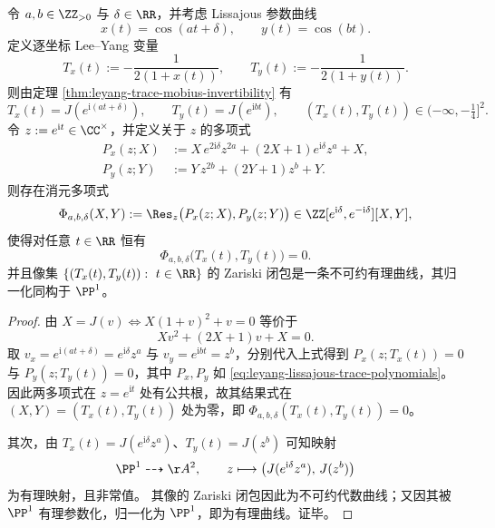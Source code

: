 \begin{theorem}[迹坐标门下的双奇异环消元与有理性]\label{thm:leyang-lissajous-trace-resultant-rational}
令 \(a,b\in\ZZ_{>0}\) 与 \(\delta\in\RR\)，并考虑 Lissajous 参数曲线
\[
x(t)=\cos(at+\delta),\qquad y(t)=\cos(bt).
\]
定义逐坐标 Lee--Yang 变量
\begin{equation}\label{eq:leyang-lissajous-trace-variables}
T_x(t):=-\frac{1}{2(1+x(t))},\qquad T_y(t):=-\frac{1}{2(1+y(t))}.
\end{equation}
则由定理 \ref{thm:leyang-trace-mobius-invertibility} 有
\[
T_x(t)=J\!\left(e^{\mathrm{i}(at+\delta)}\right),\qquad
T_y(t)=J\!\left(e^{\mathrm{i}bt}\right),
\qquad (T_x(t),T_y(t))\in(-\infty,-\tfrac14]^2.
\]
令 \(z:=e^{\mathrm{i}t}\in\CC^{\times}\)，并定义关于 \(z\) 的多项式
\begin{equation}\label{eq:leyang-lissajous-trace-polynomials}
\begin{aligned}
P_x(z;X)&:=X\,e^{2\mathrm{i}\delta}z^{2a}+(2X+1)e^{\mathrm{i}\delta}z^{a}+X,\\
P_y(z;Y)&:=Y\,z^{2b}+(2Y+1)z^{b}+Y.
\end{aligned}
\end{equation}
则存在消元多项式
\[
\Phi_{a,b,\delta}(X,Y):=\Res_z\bigl(P_x(z;X),P_y(z;Y)\bigr)\in \ZZ[e^{\mathrm{i}\delta},e^{-\mathrm{i}\delta}][X,Y],
\]
使得对任意 \(t\in\RR\) 恒有
\[
\Phi_{a,b,\delta}\bigl(T_x(t),T_y(t)\bigr)=0.
\]
并且像集 \(\{(T_x(t),T_y(t)):\ t\in\RR\}\) 的 Zariski 闭包是一条不可约有理曲线，其归一化同构于 \(\PP^1\)。
\end{theorem}
\begin{proof}
由 \(X=J(v)\iff X(1+v)^2+v=0\) 等价于
\[
Xv^2+(2X+1)v+X=0.
\]
取 \(v_x=e^{\mathrm{i}(at+\delta)}=e^{\mathrm{i}\delta}z^{a}\) 与 \(v_y=e^{\mathrm{i}bt}=z^{b}\)，分别代入上式得到
\(
P_x(z;T_x(t))=0
\)
与
\(
P_y(z;T_y(t))=0
\)，其中 \(P_x,P_y\) 如 \eqref{eq:leyang-lissajous-trace-polynomials}。
因此两多项式在 \(z=e^{\mathrm{i}t}\) 处有公共根，故其结果式在 \((X,Y)=(T_x(t),T_y(t))\) 处为零，即
\(
\Phi_{a,b,\delta}(T_x(t),T_y(t))=0
\)。

其次，由 \(T_x(t)=J(e^{\mathrm{i}\delta}z^a)\)、\(T_y(t)=J(z^b)\) 可知映射
\[
\PP^1\dashrightarrow \AA^2,\qquad z\longmapsto \bigl(J(e^{\mathrm{i}\delta}z^a),\,J(z^b)\bigr)
\]
为有理映射，且非常值。
其像的 Zariski 闭包因此为不可约代数曲线；又因其被 \(\PP^1\) 有理参数化，归一化为 \(\PP^1\)，即为有理曲线。证毕。
\end{proof}



